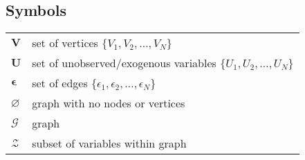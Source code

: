 \documentclass[main=english,12pt,a4paper,pdftex,econ,utf8]{aaltothesis}
\let\emptyset\varnothing
\newcommand{\z}{\mathcal{Z}}
\newcommand{\g}{\mathcal{G}}
\newcommand{\e}{\bm{\epsilon}}
\newcommand{\vars}{\bm{V}}
\newcommand{\unobs}{\bm{U}}
\begin{document}
\begin{comment}
\newpage
%
\thesistitle{Opinnäyteohje}
\advisor{TkT Olli Ohjaaja}
\degreeprogram{Electronics and electrical engineering}
\department{Radiotieteen ja -tekniikan laitos}
\professorship{Piiriteoria}
\keywords{Vastus, Resistanssi,\\ Lämpötila}
\begin{abstractpage}[finnish]
  Tiivistelmässä on lyhyt selvitys (noin 100 sanaa)
  kirjoituksen tärkeimmästä sisällöstä: mitä ja miten on tutkittu,
  sekä mitä tuloksia on saatu. 
  Tiivistelmässä on lyhyt selvitys (noin 100 sanaa)
  kirjoituksen tärkeimmästä sisällöstä: mitä ja miten on tutkittu,
  sekä mitä tuloksia on saatu. 

  Tiivistelmässä on lyhyt selvitys (noin 100 sanaa)
  kirjoituksen tärkeimmästä sisällöstä: mitä ja miten on tutkittu,
  sekä mitä tuloksia on saatu. 
  Tiivistelmässä on lyhyt selvitys (noin 100 sanaa)
  kirjoituksen tärkeimmästä sisällöstä: mitä ja miten on tutkittu,
  sekä mitä tuloksia on saatu. 
  Tiivistelmässä on lyhyt selvitys (noin 100 sanaa)
  kirjoituksen tärkeimmästä sisällöstä: mitä ja miten on tutkittu,
  sekä mitä tuloksia on saatu. 
\end{abstractpage}

\end{comment}
\newpage
%

{
\hypersetup{linkcolor=black}
\thesistableofcontents
}


\subsection*{Symbols}

\begin{tabular}{ll}
$\vars$ & set of vertices $\{V_{1},V_{2},\ldots,V_{N}\}$ \\
$\unobs$ & set of unobserved/exogenous variables $\{U_{1},U_{2},\ldots,U_{N}\}$ \\
$\e$ & set of edges $\{\epsilon_{1},\epsilon_{2},\ldots,\epsilon_{N}\}$ \\
$\emptyset$ & graph with no nodes or vertices \\
$\g$ & graph \\
$\z$ & subset of variables within graph
\end{tabular}
\end{document}
